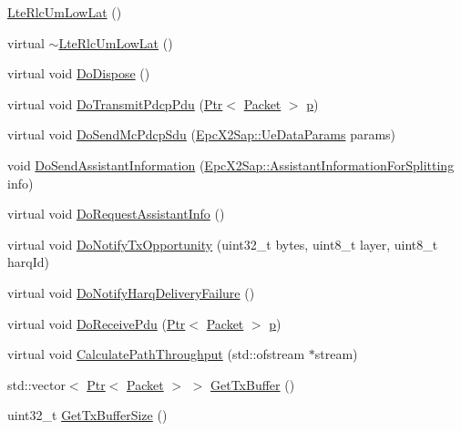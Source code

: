 \begin{DoxyCompactItemize}
\item 
\hyperlink{classns3_1_1LteRlcUmLowLat_ac5434f9561de25c85ae4457c1db52189}{Lte\+Rlc\+Um\+Low\+Lat} ()
\item 
virtual \hyperlink{classns3_1_1LteRlcUmLowLat_a717a6f8e3ecd389b17b1d452e46b78e3}{$\sim$\+Lte\+Rlc\+Um\+Low\+Lat} ()
\item 
virtual void \hyperlink{classns3_1_1LteRlcUmLowLat_a413065cdf00fd2fa2a9578ccbc7a5b31}{Do\+Dispose} ()
\item 
virtual void \hyperlink{classns3_1_1LteRlcUmLowLat_a570cdc49dbbc3de40fd81c5f31bfcdb9}{Do\+Transmit\+Pdcp\+Pdu} (\hyperlink{classns3_1_1Ptr}{Ptr}$<$ \hyperlink{classns3_1_1Packet}{Packet} $>$ \hyperlink{lte__link__budget__x2__handover__measures_8m_ac9de518908a968428863f829398a4e62}{p})
\item 
virtual void \hyperlink{classns3_1_1LteRlcUmLowLat_ac3e42361a581c35fa01291aab59f231f}{Do\+Send\+Mc\+Pdcp\+Sdu} (\hyperlink{structns3_1_1EpcX2Sap_1_1UeDataParams}{Epc\+X2\+Sap\+::\+Ue\+Data\+Params} params)
\item 
void \hyperlink{classns3_1_1LteRlcUmLowLat_a4b446246590f6bfe283c69a9fc609f6e}{Do\+Send\+Assistant\+Information} (\hyperlink{structns3_1_1EpcX2Sap_1_1AssistantInformationForSplitting}{Epc\+X2\+Sap\+::\+Assistant\+Information\+For\+Splitting} info)
\item 
virtual void \hyperlink{classns3_1_1LteRlcUmLowLat_a035004211f533b215ce63f52b21c8bc8}{Do\+Request\+Assistant\+Info} ()
\item 
virtual void \hyperlink{classns3_1_1LteRlcUmLowLat_a7a317025c0a1ff42852387b6665fee30}{Do\+Notify\+Tx\+Opportunity} (uint32\+\_\+t bytes, uint8\+\_\+t layer, uint8\+\_\+t harq\+Id)
\item 
virtual void \hyperlink{classns3_1_1LteRlcUmLowLat_a7a1dfdec46c9b60c8baffb0af892b62b}{Do\+Notify\+Harq\+Delivery\+Failure} ()
\item 
virtual void \hyperlink{classns3_1_1LteRlcUmLowLat_a6af3b60ead539ac46666cb2e9b825eb3}{Do\+Receive\+Pdu} (\hyperlink{classns3_1_1Ptr}{Ptr}$<$ \hyperlink{classns3_1_1Packet}{Packet} $>$ \hyperlink{lte__link__budget__x2__handover__measures_8m_ac9de518908a968428863f829398a4e62}{p})
\item 
virtual void \hyperlink{classns3_1_1LteRlcUmLowLat_a457ed2aecb238291492dc2375affa6b8}{Calculate\+Path\+Throughput} (std\+::ofstream $\ast$stream)
\item 
std\+::vector$<$ \hyperlink{classns3_1_1Ptr}{Ptr}$<$ \hyperlink{classns3_1_1Packet}{Packet} $>$ $>$ \hyperlink{classns3_1_1LteRlcUmLowLat_a9a71055a28e618d7fd27eb31ddf01aae}{Get\+Tx\+Buffer} ()
\item 
uint32\+\_\+t \hyperlink{classns3_1_1LteRlcUmLowLat_ada895a32edc0d629306e124e113d725c}{Get\+Tx\+Buffer\+Size} ()
\end{DoxyCompactItemize}
